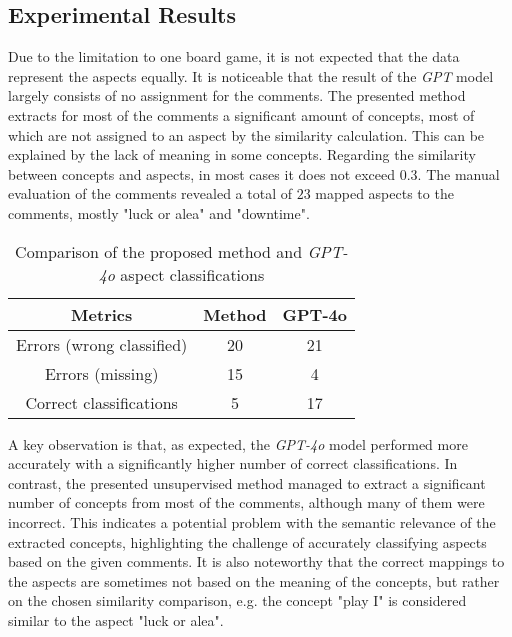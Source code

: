 \documentclass[sn-mathphys-num]{sn-jnl}%
\theoremstyle{thmstyleone}%
\theoremstyle{thmstyletwo}%
\theoremstyle{thmstylethree}%
\begin{document}
    \subsection{Experimental Results}
    Due to the limitation to one board game, it is not expected that the data represent the aspects equally. It is noticeable that the result of the \textit{GPT} model largely consists of no assignment for the comments. The presented method extracts for most of the comments a significant amount of concepts, most of which are not assigned to an aspect by the similarity calculation. This can be explained by the lack of meaning in some concepts. Regarding the similarity between concepts and aspects, in most cases it does not exceed $0.3$. The manual evaluation of the comments revealed a total of $23$ mapped aspects to the comments, mostly "luck or alea" and "downtime".
    \begin{table}[h!]
        \centering
        \begin{tabular}{|c|c|c|}
        \hline
        \textbf{Metrics} & \textbf{Method} & \textbf{GPT-4o} \\ \hline
        Errors (wrong classified) & 20 & 21 \\ \hline
        Errors (missing) & 15 & 4 \\ \hline
        Correct classifications & 5 & 17 \\ \hline
        \end{tabular}
        \caption{Comparison of the proposed method and \textit{GPT-4o} aspect classifications}
        \label{table:1}
    \end{table}
    A key observation is that, as expected, the \textit{GPT-4o} model performed more accurately with a significantly higher number of correct classifications. In contrast, the presented unsupervised method managed to extract a significant number of concepts from most of the comments, although many of them were incorrect. This indicates a potential problem with the semantic relevance of the extracted concepts, highlighting the challenge of accurately classifying aspects based on the given comments. It is also noteworthy that the correct mappings to the aspects are sometimes not based on the meaning of the concepts, but rather on the chosen similarity comparison, e.g. the concept "play I" is considered similar to the aspect "luck or alea".
        
\end{document}
